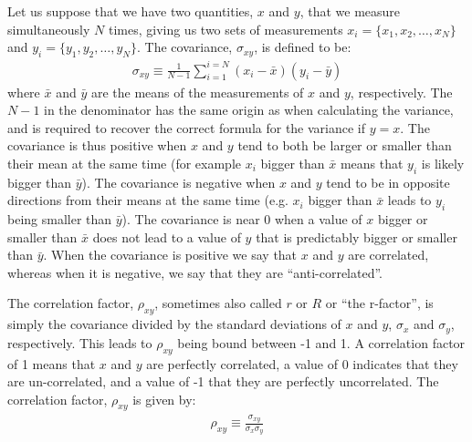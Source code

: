 Let us suppose that we have two quantities, $x$ and $y$, that we measure simultaneously $N$ times, giving us two sets of measurements  $x_i=\{x_1, x_2,\dots, x_N\}$ and $y_i=\{y_1, y_2,\dots, y_N\}$. The covariance, $\sigma_{xy}$, is defined to be:
\begin{align}
\sigma_{xy}\equiv\frac{1}{N-1}\sum_{i=1}^{i=N}(x_i-\bar x)(y_i-\bar y)
\end{align}
where $\bar x$ and $\bar y$ are the means of the measurements of $x$ and $y$, respectively. The $N-1$ in the denominator has the same origin as when calculating the variance, and is required to recover the correct formula for the variance if $y=x$. The covariance is thus positive when $x$ and $y$ tend to both be larger or smaller than their mean at the same time (for example $x_i$ bigger than $\bar x$ means that $y_i$ is likely bigger than $\bar y$). The covariance is negative when $x$ and $y$ tend to be in opposite directions from their means at the same time (e.g. $x_i$ bigger than $\bar x$ leads to $y_i$ being smaller than $\bar y$). The covariance is near 0 when a value of $x$ bigger or smaller than $\bar x$ does not lead to a value of $y$ that is predictably bigger or smaller than $\bar y$. When the covariance is positive we say that $x$ and $y$ are correlated, whereas when it is negative, we say that they are ``anti-correlated''.

The correlation factor, $\rho_{xy}$, sometimes also called $r$ or $R$ or ``the r-factor'', is simply the covariance divided by the standard deviations of $x$ and $y$, $\sigma_x$ and $\sigma_y$, respectively. This leads to $\rho_{xy}$ being bound between -1 and 1. A correlation factor of 1 means that $x$ and $y$ are perfectly correlated, a value of 0 indicates that they are un-correlated, and a value of -1 that they are perfectly uncorrelated. The correlation factor, $\rho_{xy}$ is given by:
\begin{align}
\rho_{xy}\equiv\frac{\sigma_{xy}}{\sigma_x\sigma_y}
\end{align}

